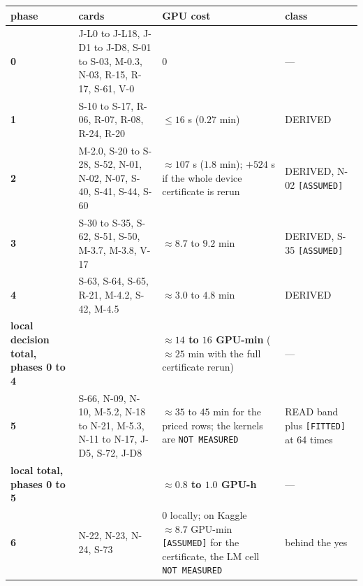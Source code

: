 \documentclass[11pt,a4paper]{article}
\newcounter{none}                 %
\theoremstyle{plain}
\theoremstyle{definition}
\theoremstyle{remark}
\begin{document}
{\def\LTcaptype{none} %
\begin{longtable}[]{@{}
  >{\raggedright\arraybackslash}p{}
  >{\raggedright\arraybackslash}p{}
  >{\raggedright\arraybackslash}p{}
  >{\raggedright\arraybackslash}p{}@{}}
\toprule\noalign{}
\begin{minipage}[b]{\linewidth}\raggedright
phase
\end{minipage} & \begin{minipage}[b]{\linewidth}\raggedright
cards
\end{minipage} & \begin{minipage}[b]{\linewidth}\raggedright
GPU cost
\end{minipage} & \begin{minipage}[b]{\linewidth}\raggedright
class
\end{minipage} \\
\midrule\noalign{}
\endhead
\bottomrule\noalign{}
\endlastfoot
\textbf{0} & J-L0 to J-L18, J-D1 to J-D8, S-01 to S-03, M-0.3, N-03,
R-15, R-17, S-61, V-0 & \(0\) & --- \\
\textbf{1} & S-10 to S-17, R-06, R-07, R-08, R-24, R-20 & \(\le16\) s
(\(0.27\) min) & DERIVED \\
\textbf{2} & M-2.0, S-20 to S-28, S-52, N-01, N-02, N-07, S-40, S-41,
S-44, S-60 & \(\approx107\) s (\(1.8\) min); \(+524\) s if the whole
device certificate is rerun & DERIVED, N-02 \texttt{{[}ASSUMED{]}} \\
\textbf{3} & S-30 to S-35, S-62, S-51, S-50, M-3.7, M-3.8, V-17 &
\(\approx8.7\) to \(9.2\) min & DERIVED, S-35 \texttt{{[}ASSUMED{]}} \\
\textbf{4} & S-63, S-64, S-65, R-21, M-4.2, S-42, M-4.5 & \(\approx3.0\)
to \(4.8\) min & DERIVED \\
\textbf{local decision total, phases 0 to 4} & & \textbf{\(\approx14\)
to \(16\) GPU-min} (\(\approx25\) min with the full certificate rerun) &
--- \\
\textbf{5} & S-66, N-09, N-10, M-5.2, N-18 to N-21, M-5.3, N-11 to N-17,
J-D5, S-72, J-D8 & \(\approx35\) to \(45\) min for the priced rows; the
kernels are \texttt{NOT\ MEASURED} & READ band plus
\texttt{{[}FITTED{]}} at 64 times \\
\textbf{local total, phases 0 to 5} & & \textbf{\(\approx0.8\) to
\(1.0\) GPU-h} & --- \\
\textbf{6} & N-22, N-23, N-24, S-73 & \(0\) locally; on Kaggle
\(\approx8.7\) GPU-min \texttt{{[}ASSUMED{]}} for the certificate, the
LM cell \texttt{NOT\ MEASURED} & behind the yes \\
\end{longtable}
}
\end{document}
